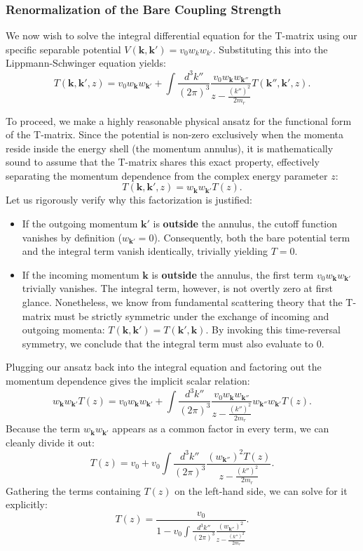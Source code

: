 \subsubsection{Renormalization of the Bare Coupling Strength}

We now wish to solve the integral differential equation for the T-matrix using our specific separable potential \( V(\mathbf{k}, \mathbf{k}') = v_0 w_k w_{k'} \). Substituting this into the Lippmann-Schwinger equation yields:
\[
    T(\mathbf{k}, \mathbf{k}', z) = v_0 w_{\mathbf{k}} w_{\mathbf{k}'} + \int \frac{d^3 k''}{(2\pi)^3} \frac{v_0 w_{\mathbf{k}} w_{\mathbf{k}''}}{z - \frac{(k'')^2}{2m_r}} T(\mathbf{k}'', \mathbf{k}', z).
\]

To proceed, we make a highly reasonable physical ansatz for the functional form of the T-matrix. Since the potential is non-zero exclusively when the momenta reside inside the energy shell (the momentum annulus), it is mathematically sound to assume that the T-matrix shares this exact property, effectively separating the momentum dependence from the complex energy parameter \( z \):
\[
    T(\mathbf{k}, \mathbf{k}', z) = w_{\mathbf{k}} w_{\mathbf{k}'} T(z).
\]
Let us rigorously verify why this factorization is justified:
\begin{itemize}
    \item If the outgoing momentum \( \mathbf{k}' \) is \textbf{outside} the annulus, the cutoff function vanishes by definition (\( w_{\mathbf{k}'} = 0 \)). Consequently, both the bare potential term and the integral term vanish identically, trivially yielding \( T = 0 \).
    \item If the incoming momentum \( \mathbf{k} \) is \textbf{outside} the annulus, the first term \( v_0 w_{\mathbf{k}} w_{\mathbf{k}'} \) trivially vanishes. The integral term, however, is not overtly zero at first glance. Nonetheless, we know from fundamental scattering theory that the T-matrix must be strictly symmetric under the exchange of incoming and outgoing momenta: \( T(\mathbf{k}, \mathbf{k}') = T(\mathbf{k}', \mathbf{k}) \). By invoking this time-reversal symmetry, we conclude that the integral term must also evaluate to \( 0 \).
\end{itemize}

Plugging our ansatz back into the integral equation and factoring out the momentum dependence gives the implicit scalar relation:
\[
    w_{\mathbf{k}} w_{\mathbf{k}'} T(z) = v_0 w_{\mathbf{k}} w_{\mathbf{k}'} + \int \frac{d^3 k''}{(2\pi)^3} \frac{v_0 w_{\mathbf{k}} w_{\mathbf{k}''}}{z - \frac{(k'')^2}{2m_r}} w_{\mathbf{k}''} w_{\mathbf{k}'} T(z).
\]
Because the term \( w_{\mathbf{k}} w_{\mathbf{k}'} \) appears as a common factor in every term, we can cleanly divide it out:
\[
    T(z) = v_0 + v_0 \int \frac{d^3 k''}{(2\pi)^3} \frac{(w_{\mathbf{k}''})^2 T(z)}{z - \frac{(k'')^2}{2m_r}}.
\]
Gathering the terms containing \( T(z) \) on the left-hand side, we can solve for it explicitly:
\[
    T(z) = \frac{v_0}{1 - v_0 \int \frac{d^3 k''}{(2\pi)^3} \frac{(w_{\mathbf{k}''})^2}{z - \frac{(k'')^2}{2m_r}}}.
\]


